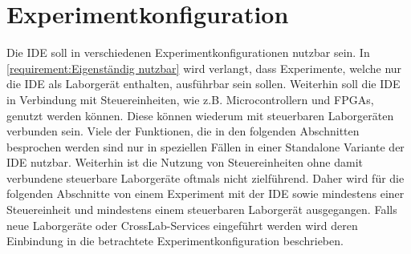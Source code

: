 \section{Experimentkonfiguration}\label{section:konzeption:experimentkonfiguration}

Die IDE soll in verschiedenen Experimentkonfigurationen nutzbar sein. In \autoref{requirement:Eigenständig nutzbar} wird verlangt, dass Experimente, welche nur die IDE als Laborgerät enthalten, ausführbar sein sollen. Weiterhin soll die IDE in Verbindung mit Steuereinheiten, wie z.B. Microcontrollern und FPGAs, genutzt werden können. Diese können wiederum mit steuerbaren Laborgeräten verbunden sein. Viele der Funktionen, die in den folgenden Abschnitten besprochen werden sind nur in speziellen Fällen in einer Standalone Variante der IDE nutzbar. Weiterhin ist die Nutzung von Steuereinheiten ohne damit verbundene steuerbare Laborgeräte oftmals nicht zielführend. Daher wird für die folgenden Abschnitte von einem Experiment mit der IDE sowie mindestens einer Steuereinheit und mindestens einem steuerbaren Laborgerät ausgegangen. Falls neue Laborgeräte oder CrossLab-Services eingeführt werden wird deren Einbindung in die betrachtete Experimentkonfiguration beschrieben.